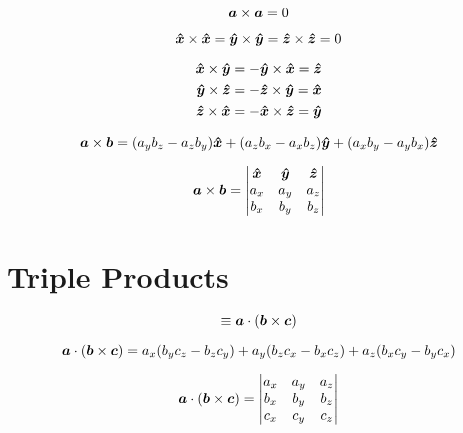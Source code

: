 \begin{equation*}
    \boldsymbol{a} \times \boldsymbol{a} = 0
\end{equation*}

\begin{equation*}
    \boldsymbol{\hat{x}} \times \boldsymbol{\hat{x}} =
    \boldsymbol{\hat{y}} \times \boldsymbol{\hat{y}} =
    \boldsymbol{\hat{z}} \times \boldsymbol{\hat{z}} = 0
\end{equation*}

\begin{align*}
    \boldsymbol{\hat{x}} \times \boldsymbol{\hat{y}} =
    - \boldsymbol{\hat{y}} \times \boldsymbol{\hat{x}} =
    \boldsymbol{\hat{z}}\\
    \boldsymbol{\hat{y}} \times \boldsymbol{\hat{z}} =
    -\boldsymbol{\hat{z}} \times \boldsymbol{\hat{y}} =
    \boldsymbol{\hat{x}}\\
    \boldsymbol{\hat{z}} \times \boldsymbol{\hat{x}} =
    -\boldsymbol{\hat{x}} \times \boldsymbol{\hat{z}} =
    \boldsymbol{\hat{y}}
\end{align*}

\begin{equation*}
    \boldsymbol{a} \times \boldsymbol{b} = (a_yb_z - a_zb_y)\boldsymbol{\hat{x}} + 
    (a_zb_x - a_xb_z)\boldsymbol{\hat{y}} + 
    (a_xb_y - a_yb_x)\boldsymbol{\hat{z}}
\end{equation*}

\begin{equation*}
    \boldsymbol{a} \times \boldsymbol{b} = 
    \begin{vmatrix}
        \boldsymbol{\hat{x}} & \boldsymbol{\hat{y}} & \boldsymbol{\hat{z}} \\ 
        a_x & a_y & a_z \\ 
        b_x & b_y & b_z \\ 
    \end{vmatrix}
\end{equation*}

\section{Triple Products}

\begin{equation*}
    [\vct{a}, \vct{b}, \vct{c}] \equiv \vct{a} \cdot (\vct{b} \times \vct{c})
\end{equation*}

\begin{equation*}
    \boldsymbol{a} \cdot (\boldsymbol{b} \times \boldsymbol{c}) = 
    a_x(b_yc_z - b_zc_y) + a_y(b_zc_x - b_xc_z) +
    a_z(b_xc_y - b_yc_x)
\end{equation*}

\begin{equation*}
    \boldsymbol{a} \cdot (\boldsymbol{b} \times \boldsymbol{c}) = 
    \begin{vmatrix}
        a_x & a_y & a_z \\ 
        b_x & b_y & b_z \\ 
        c_x & c_y & c_z \\ 
    \end{vmatrix}
\end{equation*}

